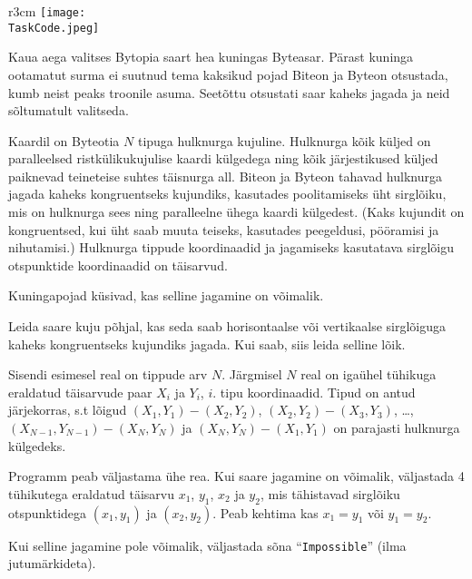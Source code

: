 ﻿\documentclass{boi2014-et}
\renewcommand{\TaskCode}{demarcation}
\newcommand{\constant}[1]{{\tt #1}}
\begin{document}
    \begin{wrapfigure}{r}{3cm}
        \vspace{-24pt}
        \texttt{[image: \\TaskCode.jpeg]}
    \end{wrapfigure}

    Kaua aega valitses Bytopia saart hea kuningas Byteasar.
    Pärast kuninga ootamatut surma ei suutnud tema kaksikud pojad
    Biteon ja Byteon otsustada, kumb neist peaks troonile asuma.
    Seetõttu otsustati saar kaheks jagada ja neid sõltumatult valitseda.

    Kaardil on Byteotia $N$ tipuga hulknurga kujuline.
    Hulknurga kõik küljed on paralleelsed ristkülikukujulise kaardi külgedega ning
    kõik järjestikused küljed paiknevad teineteise suhtes täisnurga all.
    Biteon ja Byteon tahavad hulknurga jagada kaheks kongruentseks kujundiks,
    kasutades poolitamiseks üht sirglõiku,
    mis on hulknurga sees ning paralleelne ühega kaardi külgedest.
    (Kaks kujundit on kongruentsed, kui üht saab muuta teiseks,
    kasutades peegeldusi, pööramisi ja nihutamisi.)
    Hulknurga tippude koordinaadid ja jagamiseks
    kasutatava sirglõigu otspunktide koordinaadid on täisarvud.

    Kuningapojad küsivad, kas selline jagamine on võimalik.

    \Task

    Leida saare kuju põhjal, kas seda saab horisontaalse või vertikaalse sirglõiguga
    kaheks kongruentseks kujundiks jagada.
    Kui saab, siis leida selline lõik.

    \Input

    Sisendi esimesel real on tippude arv $N$.
    Järgmisel $N$ real on igaühel tühikuga eraldatud täisarvude paar
    $X_i$ ja $Y_i$, $i$. tipu koordinaadid.
    Tipud on antud järjekorras, s.t lõigud $(X_1,Y_1) - (X_2,Y_2)$,
    $(X_2,Y_2) - (X_3,Y_3)$, \ldots, $(X_{N-1},Y_{N-1}) - (X_N,Y_N)$ ja
    $(X_N,Y_N) - (X_1,Y_1)$ on parajasti hulknurga külgedeks.

    \Output

    Programm peab väljastama ühe rea.
    Kui saare jagamine on võimalik, väljastada 4 tühikutega eraldatud täisarvu
    $x_1$, $y_1$, $x_2$ ja $y_2$, mis tähistavad sirglõiku otspunktidega
    $(x_1, y_1)$ ja $(x_2, y_2)$.
    Peab kehtima kas $x_1 = y_1$ või $y_1 = y_2$.

    Kui selline jagamine pole võimalik, väljastada sõna
    ``\constant{Impossible}'' (ilma jutumärkideta).
\end{document}

